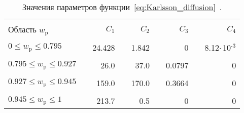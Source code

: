 \begin{table}[h]
	\begin{center}
		\caption{Значения параметров функции~\ref{eq:Karlsson_diffusion}~\cite{Karlsson2001_diffusion}.}
		\begin{tabular}{lc rc rc rc r}
			\hline \hline \\ [-1em]
			Область $w_\mathrm{p}$ & \hspace{1em} & $C_1$ & \hspace{1em} & $C_2$ & \hspace{1em} & $C_3$ & \hspace{1em} & $C_4$
			\\ \hline \\ [-1em]
			$0 \leq w_\mathrm{p} \leq 0.795$ & \hspace{1em} & 24.428 & \hspace{1em} & 1.842 & \hspace{1em} & 0 & \hspace{1em} & 8.12\:$\cdot$\,10$^\text{-3}$
			\\ \\ [-1em]
			$0.795 \leq w_\mathrm{p} \leq 0.927$ & \hspace{1em} & 26.0 & \hspace{1em} & 37.0 & \hspace{1em} & 0.0797 & \hspace{1em} & 0
			\\ \\ [-1em]
			$0.927 \leq w_\mathrm{p} \leq 0.945$ & \hspace{1em} & 159.0 & \hspace{1em} & 170.0 & \hspace{1em} & 0.3664 & \hspace{1em} & 0
			\\ \\ [-1em]
			$0.945 \leq w_\mathrm{p} \leq 1$ & \hspace{1em} & 213.7 & \hspace{1em} & 0.5 & \hspace{1em} & 0 & \hspace{1em} & 0
			\\ \hline \hline
		\end{tabular}
		\label{table:Karlsson_diffusion}
	\end{center}
\end{table}



